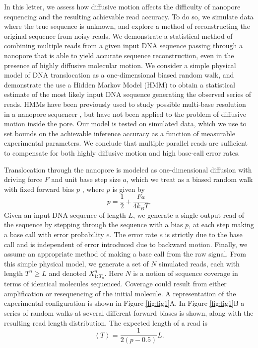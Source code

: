 \documentclass{biophys_letter}
\begin{document}
In this letter, we assess how diffusive motion affects the difficulty of nanopore sequencing and the resulting achievable read accuracy.
To do so, we simulate data where the true sequence is unknown, and explore a method of reconstructing the original sequence from noisy reads.
We demonstrate a statistical method of combining multiple reads from a given input DNA sequence passing through a nanopore that is able to yield accurate sequence reconstruction, even in the presence of highly diffusive molecular motion.
We consider a simple physical model of DNA translocation as a one-dimensional biased random walk, and demonstrate the use a Hidden Markov Model (HMM) to obtain a statistical estimate of the most likely input DNA sequence generating the observed series of reads.
HMMs have been previously used to study possible multi-base resolution in a nanopore sequencer \cite{Timp:2012}, but have not been applied to the problem of diffusive motion inside the pore.
Our model is tested on simulated data, which we use to set bounds on the achievable inference accuracy as a function of measurable experimental parameters.
We conclude that multiple parallel reads are sufficient to compensate for both highly diffusive motion and high base-call error rates.

Translocation through the nanopore is modeled as one-dimensional diffusion with driving force $F$ and unit base step size $a$, which we treat as a biased random walk with fixed forward bias $p$ \cite{Berg:1993}, where $p$ is given by
\begin{equation}
p = \frac{1}{2} + \frac{Fa}{4k_{B}T}.
\end{equation}
Given an input DNA sequence of length $L$, we generate a single output read of the sequence by stepping through the sequence with a bias $p$, at each step making a base call with error probability $e$.
The error rate $e$ is strictly due to the base call and is independent of error introduced due to backward motion. 
Finally, we assume an appropriate method of making a base call from the raw signal.
From this simple physical model, we generate a set of $N$ simulated reads, each with length $T^{n} \ge L$ and denoted $X^n_{1:T_n}$.
Here $N$ is a notion of sequence coverage in terms of identical molecules sequenced.
Coverage could result from either amplification or resequencing of the initial molecule.
A representation of the experimental configuration is shown in Figure \ref{fig:fig1}A.
In Figure \ref{fig:fig1}B a series of random walks at several different forward biases is shown, along with the resulting read length distribution.
The expected length of a read is 
\begin{equation}
  \left\langle T  \right\rangle = \frac{1}{2(p-0.5)} L.
\end{equation}
\end{document}
